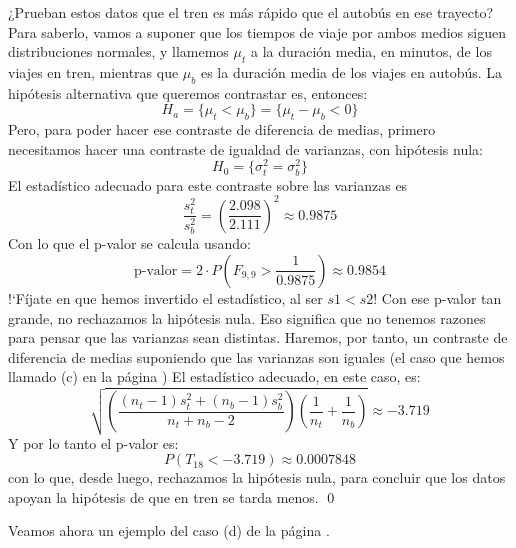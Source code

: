 \begin{ejemplo}
¿Prueban estos datos que el  tren es más rápido que el autobús en ese trayecto? Para saberlo, vamos a  suponer que los tiempos de viaje por ambos medios siguen distribuciones normales, y llamemos $\mu_t$ a la duración media, en minutos, de los viajes en tren, mientras que $\mu_b$ es la duración media de los viajes en autobús. La hipótesis alternativa que queremos contrastar es, entonces:
\[H_a=\{\mu_t<\mu_b\}=\{\mu_t-\mu_b<0\}\]
Pero, para poder hacer ese contraste de diferencia de medias, primero necesitamos hacer una contraste de igualdad de varianzas, con hipótesis nula:
\[H_0=\{\sigma^2_t=\sigma^2_b\}\]
El estadístico adecuado para este contraste sobre las varianzas es
\[\dfrac{s_t^2}{s_b^2}=\left(\dfrac{2.098}{2.111}\right)^2\approx 0.9875\]
Con lo que el p-valor se calcula usando:
\[\mbox{p-valor}=2\cdot P\left(F_{9,9}>\dfrac{1}{0.9875}\right)\approx 0.9854\]
{!`}Fíjate en que hemos invertido el estadístico, al ser $s1<s2$! Con ese p-valor tan grande, no rechazamos la hipótesis nula. Eso significa que no tenemos razones para pensar que las varianzas sean distintas. Haremos, por tanto, un contraste de diferencia de medias suponiendo que las varianzas son iguales (el caso que hemos llamado (c) en la página \pageref{cap09:lugar:ContrasteDiferenciaMediasVarianzasIguales})
El estadístico adecuado, en este caso, es:
\[
    \sqrt{\left(\dfrac{(n_t-1)s_t^2+(n_b-1)s_b^2}{n_t+n_b-2}\right)
    \left(\dfrac{1}{n_t}+\dfrac{1}{n_b}\right)}\approx -3.719
\]
Y por lo tanto el p-valor es:
\[P(T_{18} < -3.719)\approx 0.0007848\]
con lo que, desde luego, rechazamos la hipótesis nula, para concluir que los datos apoyan la hipótesis de que en tren se tarda menos.
\qed
\end{ejemplo}
\noindent Veamos ahora un ejemplo del caso (d) de la página \pageref{cap09:lugar:ContrasteDiferenciaMediasVarianzasIguales}.
